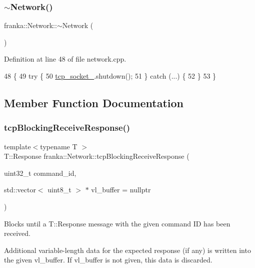 \subsubsection{\texorpdfstring{$\sim$\+Network()}{~Network()}}
{\footnotesize\ttfamily franka\+::\+Network\+::$\sim$\+Network (\begin{DoxyParamCaption}{ }\end{DoxyParamCaption})}



Definition at line 48 of file network.\+cpp.


\begin{DoxyCode}
48                   \{
49   \textcolor{keywordflow}{try} \{
50     \hyperlink{classfranka_1_1Network_a2c26c04f9ccb9792074799b101ee53e9}{tcp\_socket\_}.shutdown();
51   \} \textcolor{keywordflow}{catch} (...) \{
52   \}
53 \}
\end{DoxyCode}


\subsection{Member Function Documentation}
\mbox{\label{classfranka_1_1Network_ae946c4dc9673902bd3e40a1bef65862a}} 
\subsubsection{\texorpdfstring{tcp\+Blocking\+Receive\+Response()}{tcpBlockingReceiveResponse()}}
{\footnotesize\ttfamily template$<$typename T $>$ \\
T\+::\+Response franka\+::\+Network\+::tcp\+Blocking\+Receive\+Response (\begin{DoxyParamCaption}\item[{uint32\+\_\+t}]{command\+\_\+id,  }\item[{std\+::vector$<$ uint8\+\_\+t $>$ $\ast$}]{vl\+\_\+buffer = {\ttfamily nullptr} }\end{DoxyParamCaption})}

Blocks until a T\+::\+Response message with the given command ID has been received.

Additional variable-\/length data for the expected response (if any) is written into the given vl\+\_\+buffer. If vl\+\_\+buffer is not given, this data is discarded.


